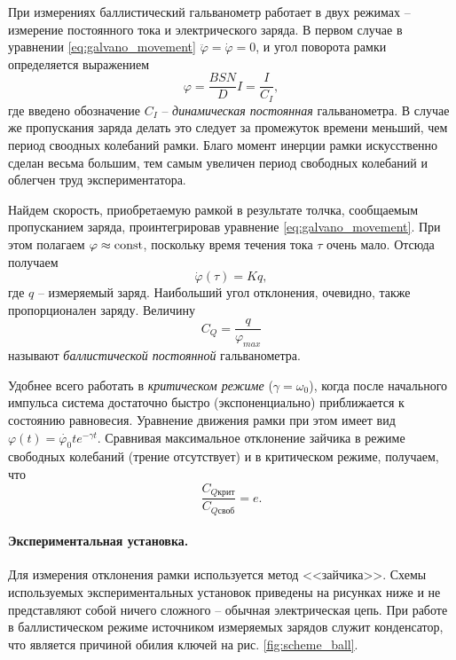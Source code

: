 \documentclass{../lab_class}
\begin{document}
При измерениях баллистический гальванометр работает в двух режимах -- измерение постоянного тока и электрического заряда. В первом случае в уравнении \eqref{eq:galvano_movement} $\ddot{\varphi} = \dot{\varphi} = 0$, и угол поворота рамки определяется выражением
\begin{equation*}
	\varphi = \frac{BSN}{D} I = \frac{I}{C_I},
\end{equation*}
где введено обозначение $C_I$ -- \emph{динамическая постоянная} гальванометра. В случае же пропускания заряда делать это следует за промежуток времени меньший, чем период своодных колебаний рамки. Благо момент инерции рамки искусственно сделан весьма большим, тем самым увеличен период свободных колебаний и облегчен труд экспериментатора. 

Найдем скорость, приобретаемую рамкой в результате толчка, сообщаемым пропусканием заряда, проинтегрировав уравнение \eqref{eq:galvano_movement}. При этом полагаем $\varphi \approx \text{const}$, поскольку время течения тока $\tau$ очень мало. Отсюда получаем
\begin{equation*}
	\dot{\varphi}(\tau) = Kq,
\end{equation*}
где $q$ -- измеряемый заряд. Наибольший угол отклонения, очевидно, также пропорционален заряду. Величину
\begin{equation*}
	C_Q = \frac{q}{\varphi_{max}}
\end{equation*}
называют \emph{баллистической постоянной} гальванометра.

Удобнее всего работать в \emph{критическом режиме} ($\gamma = \omega_0$), когда после начального импульса система достаточно быстро (экспоненциально) приближается к состоянию равновесия. Уравнение движения рамки при этом имеет вид $\varphi(t) = \dot{\varphi_0} t e^{-\gamma t}$. Сравнивая максимальное отклонение зайчика в режиме свободных колебаний (трение отсутствует) и в критическом режиме, получаем, что
\begin{equation*}
	\frac{C_{Q\text{крит}}}{C_{Q\text{своб}}} = e.
\end{equation*}

\paragraph{Экспериментальная установка.}

Для измерения отклонения рамки используется метод <<зайчика>>. Схемы используемых экспериментальных установок приведены на рисунках ниже и не представляют собой ничего сложного -- обычная электрическая цепь. При работе в баллистическом режиме источником измеряемых зарядов служит конденсатор, что является причиной обилия ключей на рис. \ref{fig:scheme_ball}.
\end{document}
